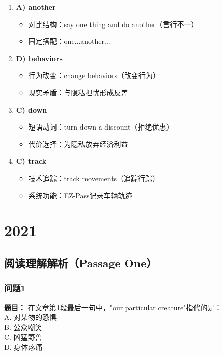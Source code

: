 \documentclass{article}
\begin{document}
\begin{enumerate}[resume*]
    \item \textbf{A) another} 
    \begin{itemize}
        \item 对比结构：say one thing and do another（言行不一）
        \item 固定搭配：one...another...
    \end{itemize}
    
    \item \textbf{D) behaviors} 
    \begin{itemize}
        \item 行为改变：change behaviors（改变行为）
        \item 现实矛盾：与隐私担忧形成反差
    \end{itemize}
    
    \item \textbf{C) down} 
    \begin{itemize}
        \item 短语动词：turn down a discount（拒绝优惠）
        \item 代价选择：为隐私放弃经济利益
    \end{itemize}
    
    \item \textbf{C) track} 
    \begin{itemize}
        \item 技术追踪：track movements（追踪行踪）
        \item 系统功能：EZ-Pass记录车辆轨迹
    \end{itemize}
\end{enumerate}

\newpage
\section*{2021}

\subsection*{阅读理解解析（Passage One）}

\subsubsection*{问题1}
\textbf{题目：} 在文章第1段最后一句中，"our particular creature"指代的是：\\
A. 对某物的恐惧 \\
B. 公众嘲笑 \\
C. 凶猛野兽 \\
D. 身体疼痛
\end{document}
